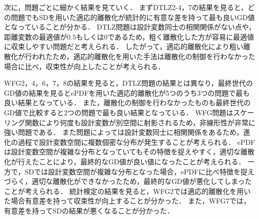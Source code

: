 \documentclass[../main/main]{subfiles}
\begin{document}
次に，問題ごとに細かく結果を見ていく．
まずDTLZ2-4，7の結果を見ると，どの問題でもSDを用いた適応的離散化が統計的に有意な差を持って最も良いGD値となっていることが分かる．
DTLZ問題は設計変数同士の相関関係がない点や，距離変数の最適値が$0.5$もしくは$0$であるため，粗く離散化した方が容易に最適値に収束しやすい問題だと考えられる．
したがって，適応的離散化により粗い離散化が行われたため，適応的離散化を用いた手法は離散化の制御を行わなかった場合に比べ，収束性が向上したことが考えられる．

WFG2，4，6，7，8の結果を見ると，DTLZ問題の結果とは異なり，最終世代のGD値の結果を見るとePDFを用いた適応的離散化が5つのうち3つの問題で最も良い結果となっている．
また，離散化の制御を行わなかったものも最終世代のGD値で比較すると2つの問題で最も良い結果となっている．
WFG問題はスケーリング関数により何度も設計変数が別空間に射影されるため，非線形性が非常に強い問題である．
また問題によっては設計変数同士に相関関係をあるため，進化の過程で設計変数空間に複数個密な分布が発生することが考えられる．
ePDFは設計変数空間が複雑な分布となっていてもその特徴を捉えやすく，適切な離散化が行えたことにより，最終的なGD値が良い値になったことが考えられる．
一方で，SDでは設計変数空間が複雑な分布となった場合，ePDFに比べ特徴を捉えづらく，適切な離散化ができなかったため，最終的なGD値が悪化してしまったことが考えられる．
統計検定の結果を見ると，WFG2では適応的離散化を用いた場合有意差を持って収束性が向上することが分かった．
また，WFG7では，有意差を持ってSDの結果が悪くなることが分かった．
\end{document}
